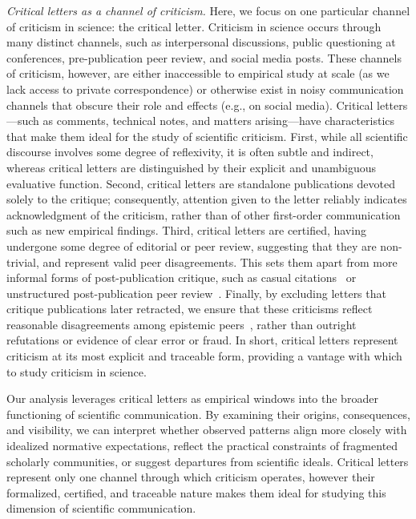 \documentclass[12pt]{article} %
\begin{document}
\textit{Critical letters as a channel of criticism.}
Here, we focus on one particular channel of criticism in science: the critical letter. 
Criticism in science occurs through many distinct channels, such as interpersonal discussions, public questioning at conferences, pre-publication peer review, and social media posts.
These channels of criticism, however, are either inaccessible to empirical study at scale (as we lack access to private correspondence) or otherwise exist in noisy communication channels that obscure their role and effects (e.g., on social media).
Critical letters---such as comments, technical notes, and matters arising---have characteristics that make them ideal for the study of scientific criticism.
First, while all scientific discourse involves some degree of reflexivity, it is often subtle and indirect, whereas critical letters are distinguished by their explicit and unambiguous evaluative function. 
Second, critical letters are standalone publications devoted solely to the critique; consequently, attention given to the letter reliably indicates acknowledgment of the criticism, rather than of other first-order communication such as new empirical findings.
Third, critical letters are certified, having undergone some degree of editorial or peer review, suggesting that they are non-trivial, and represent valid peer disagreements. 
This sets them apart from more informal forms of post-publication critique, such as casual citations~\cite{catalini_2015_negative,lamers_2021_disagreement} or unstructured post-publication peer review~\cite{hardwicke_2022_critique}.
Finally, by excluding letters that critique publications later retracted, we ensure that these criticisms reflect reasonable disagreements among epistemic peers~\cite{matheson2015disagreement}, rather than outright refutations or evidence of clear error or fraud.
In short, critical letters represent criticism at its most explicit and traceable form, providing a vantage with which to study criticism in science.

Our analysis leverages critical letters as empirical windows into the broader functioning of scientific communication. 
By examining their origins, consequences, and visibility, we can interpret whether observed patterns align more closely with idealized normative expectations, reflect the practical constraints of fragmented scholarly communities, or suggest departures from scientific ideals. 
Critical letters represent only one channel through which criticism operates, however their formalized, certified, and traceable nature makes them ideal for studying this dimension of scientific communication. 
\end{document}
